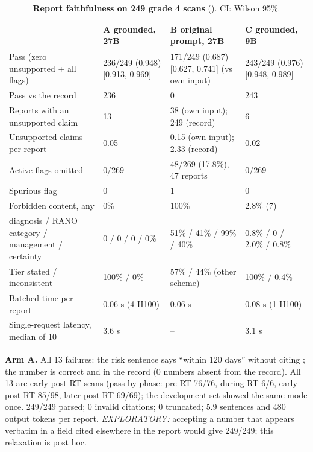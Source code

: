 \documentclass[11pt,a4paper]{article}
\begin{document}
\begin{table}[H]
\centering
\footnotesize
\renewcommand{\thetable}{S26}\renewcommand{\theHtable}{S26}
\caption{\textbf{Report faithfulness on 249 grade 4 scans} (). CI: Wilson 95\%.}
\label{tab:S26}
\begin{tabularx}{\linewidth}{@{}L R{3.4cm} R{3.6cm} R{3.4cm}@{}}
\toprule
 & A grounded, 27B & B original prompt, 27B & C grounded, 9B \\
\midrule
Pass (zero unsupported + all flags) & 236/249 (0.948) [0.913, 0.969] & 171/249 (0.687) [0.627, 0.741] (vs own input) & 243/249 (0.976) [0.948, 0.989] \\
Pass vs the record & 236 & 0 & 243 \\
Reports with an unsupported claim & 13 & 38 (own input); 249 (record) & 6 \\
Unsupported claims per report & 0.05 & 0.15 (own input); 2.33 (record) & 0.02 \\
Active flags omitted & 0/269 & 48/269 (17.8\%), 47 reports & 0/269 \\
Spurious flag & 0 & 1 & 0 \\
Forbidden content, any & 0\% & 100\% & 2.8\% (7) \\
\quad diagnosis / RANO category / management / certainty & 0 / 0 / 0 / 0\% & 51\% / 41\% / 99\% / 40\% & 0.8\% / 0 / 2.0\% / 0.8\% \\
Tier stated / inconsistent & 100\% / 0\% & 57\% / 44\% (other scheme) & 100\% / 0.4\% \\
Batched time per report & 0.06 s (4 H100) & 0.06 s & 0.08 s (1 H100) \\
Single-request latency, median of 10 & 3.6 s & -- & 3.1 s \\
\bottomrule
\end{tabularx}
\end{table}

\textbf{Arm A.} All 13 failures: the risk sentence says ``within 120 days'' without citing ;
the number is correct and in the record (0 numbers absent from the record). All 13 are early post-RT scans (pass by
phase: pre-RT 76/76, during RT 6/6, early post-RT 85/98, later post-RT 69/69); the development set showed the same
mode once. 249/249 parsed; 0 invalid citations; 0 truncated; 5.9 sentences and 480 output tokens per report.
\emph{EXPLORATORY:} accepting a number that appears verbatim in a field cited elsewhere in the report would give
249/249; this relaxation is post hoc.
\end{document}
